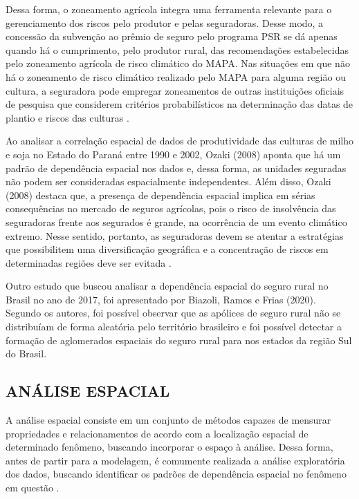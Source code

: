 \documentclass[12pt,a4paper]{article}
\begin{document}
Dessa forma, o zoneamento agrícola integra uma ferramenta relevante para o gerenciamento dos riscos pelo produtor e pelas seguradoras. Desse modo, a concessão da subvenção ao prêmio de seguro pelo programa PSR se dá apenas quando há o cumprimento, pelo produtor rural, das recomendações estabelecidas pelo zoneamento agrícola de risco climático do MAPA. Nas situações em que não há o zoneamento de risco climático realizado pelo MAPA para alguma região ou cultura, a seguradora pode empregar zoneamentos de outras instituições oficiais de pesquisa que considerem critérios probabilísticos na determinação das datas de plantio e riscos das culturas \cite{santos16}. 

Ao analisar a correlação espacial de dados de produtividade das culturas de milho e soja no Estado do Paraná entre 1990 e 2002, Ozaki (2008) aponta que há um padrão de dependência espacial nos dados e, dessa forma, as unidades seguradas não podem ser consideradas espacialmente independentes. Além disso, Ozaki (2008) destaca que, a presença de dependência espacial implica em sérias consequências no mercado de seguros agrícolas, pois o risco de insolvência das seguradoras frente aos segurados é grande, na ocorrência de um evento climático extremo.  Nesse sentido, portanto, as seguradoras devem se atentar a estratégias que possibilitem uma diversificação geográfica e a concentração de riscos em determinadas regiões deve ser evitada \cite{ozaki08_g}. 

Outro estudo que buscou analisar a dependência espacial do seguro rural no Brasil no ano de 2017, foi apresentado por Biazoli, Ramos e Frias (2020). Segundo os autores, foi possível observar que as apólices de seguro rural não se distribuíam de forma aleatória pelo território brasileiro e foi possível detectar a formação de aglomerados espaciais do seguro rural para nos estados da região Sul do Brasil. %

\subsection{ANÁLISE ESPACIAL}  
	
A análise espacial consiste em um conjunto de métodos capazes de mensurar propriedades e relacionamentos de acordo com a localização espacial de determinado fenômeno, buscando incorporar o espaço à análise. Dessa forma, antes de partir para a modelagem, é comumente  realizada a análise exploratória dos dados, buscando identificar os padrões de dependência espacial no fenômeno em questão \cite{camara04_g}.
\end{document}
